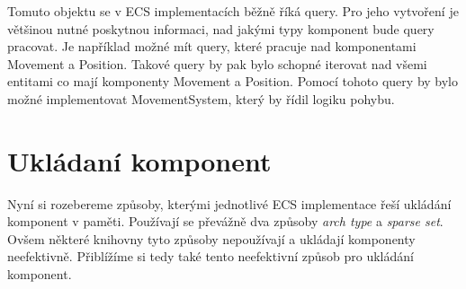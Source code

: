 Tomuto objektu se v ECS implementacích běžně říká query. Pro jeho vytvoření je většinou nutné poskytnou informaci, nad jakými typy komponent bude query pracovat. Je například možné mít query, které pracuje nad komponentami Movement a Position. Takové query by pak bylo schopné iterovat nad všemi entitami co mají komponenty Movement a Position. Pomocí tohoto query by bylo možné implementovat MovementSystem, který by řídil logiku pohybu.






\section{Ukládaní komponent}
Nyní si rozebereme způsoby, kterými jednotlivé ECS implementace řeší ukládání komponent v paměti. Používají se převážně dva způsoby \textit{arch type} a \textit{sparse set}. Ovšem některé knihovny tyto způsoby nepoužívají a ukládají komponenty neefektivně. Přiblížíme si tedy také tento neefektivní způsob pro ukládání komponent.

